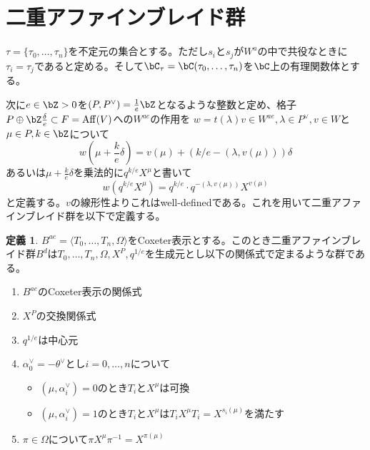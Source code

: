 \documentclass[uplatex, a4paper, dvipdfmx]{jsarticle}
\theoremstyle{definition}
\newtheorem{definition}[theorem]{定義}
\DeclareMathOperator{\Aff}{\mathrm{Aff}}
\begin{document}
\section{二重アファインブレイド群}
$\tau =\{\tau_0, \dots, \tau_n\}$を不定元の集合とする。ただし$s_i$と$s_j$が$W^a$の中で共役なときに$\tau_i = \tau_j$であると定める。そして$\bC_\tau = \bC(\tau_0, \dots, \tau_n)$を$\bC$上の有理関数体とする。

次に$e \in \bZ>0$を$(P, P^\vee) = \frac{1}{e}\bZ$となるような整数と定め、格子$P \oplus \bZ \frac{\delta}{e} \subset F = \Aff(V)$への$W^{ae}$の作用を
$w = t(\lambda)v \in W^{ae}, \lambda \in P^\vee, v \in W$と$\mu \in P, k \in \bZ$について
\begin{equation}
    w\left(\mu + \frac{k}{e} \delta\right) = v(\mu) +\left(k/e - (\lambda, v(\mu))\right)\delta
\end{equation}
あるいは$\mu + \frac{k}{e} \delta$を乗法的に$q^{k/e} X^\mu$と書いて
\begin{equation}
    w(q^{k/e}X^\mu) = q^{k/e} \cdot q^{-(\lambda, v(\mu))}X^{v(\mu)}
\end{equation}
と定義する。$v$の線形性よりこれはwell-definedである。これを用いて二重アファインブレイド群を以下で定義する。
\begin{definition}
    $B^{ae} = \langle T_0, \dots, T_n, \Omega\rangle$をCoxeter表示とする。このとき二重アファインブレイド群$B^d$は$T_0, \dots, T_n, \Omega, X^P, q^{1/e}$を生成元とし以下の関係式で定まるような群である。
    \begin{enumerate}
        \item $B^{ae}$のCoxeter表示の関係式
        \item $X^P$の交換関係式
        \item $q^{1/e}$は中心元
        \item $\alpha_0^\vee = -\theta^\vee$とし$i = 0, \dots, n$について
              \begin{itemize}
                  \item $(\mu, \alpha_i^\vee) = 0$のとき$T_i$と$X^\mu$は可換
                  \item $(\mu, \alpha_i^\vee) = 1$のとき$T_i$と$X^\mu$は$T_iX^\mu T_i = X^{s_i(\mu)}$を満たす
              \end{itemize}
        \item $\pi \in \Omega$について$\pi X^\mu \pi^{-1} = X^{\pi(\mu)}$
    \end{enumerate}
\end{definition}
\end{document}
